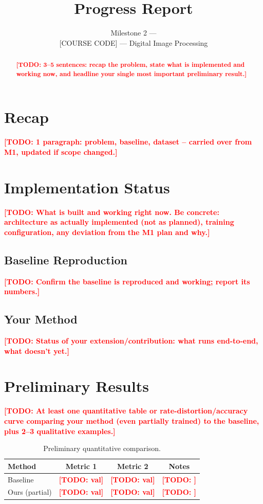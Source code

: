 \documentclass[11pt]{article}
\title{\LARGE Progress Report \\[4pt]
\large \todo{Project Title}}
\author{
  \todo{Student A Full Name} \and
  \todo{Student B Full Name} \and
  \todo{Student C Full Name}
}
\date{Milestone 2 --- \todo{Date} \\{} [COURSE CODE] --- Digital Image Processing}
\newcommand{\todo}[1]{\textcolor{red}{\textbf{[TODO: #1]}}}
\begin{document}
\maketitle

\begin{abstract}
\todo{3--5 sentences: recap the problem, state what is implemented and working now,
and headline your single most important preliminary result.}
\end{abstract}

\section{Recap}
\label{sec:recap}
\todo{1 paragraph: problem, baseline, dataset -- carried over from M1, updated if scope
changed.}

\section{Implementation Status}
\label{sec:status}
\todo{What is built and working right now. Be concrete: architecture as actually
implemented (not as planned), training configuration, any deviation from the M1 plan
and why.}

\subsection{Baseline Reproduction}
\todo{Confirm the baseline is reproduced and working; report its numbers.}

\subsection{Your Method}
\todo{Status of your extension/contribution: what runs end-to-end, what doesn't yet.}

\section{Preliminary Results}
\label{sec:results}
\todo{At least one quantitative table or rate-distortion/accuracy curve comparing your
method (even partially trained) to the baseline, plus 2--3 qualitative examples.}

\begin{table}[h]
\centering
\caption{Preliminary quantitative comparison.}
\label{tab:prelim}
\begin{tabular}{@{}lccc@{}}
\toprule
\textbf{Method} & \textbf{Metric 1} & \textbf{Metric 2} & \textbf{Notes} \\
\midrule
Baseline        & \todo{val} & \todo{val} & \todo{} \\
Ours (partial)  & \todo{val} & \todo{val} & \todo{} \\
\bottomrule
\end{tabular}
\end{table}
\end{document}
